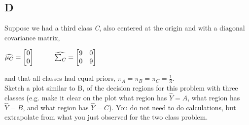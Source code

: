 \documentclass[12pt]{article}
\newcommand\tab[1][1cm]{\hspace*{#1}}
\begin{document}
\subsection{D}
Suppose we had a third class \emph{C}, also centered at the origin and with a diagonal covariance matrix,
\begin{center}
    $\widehat{\mu_C} = \begin{bmatrix}
            0 \\
            0
        \end{bmatrix}
        \tab
        \widehat{\sum_C} = \begin{bmatrix}
            9 & 0 \\
            0 & 9
        \end{bmatrix}
    $
\end{center}
and that all classes had equal priors, $\pi_A = \pi_B = \pi_C = \frac{1}{3}$.\\
Sketch a plot similar to B, of the decision regions for this problem with three classes (e.g. make it clear on the plot what region has $\hat{Y} = A$, what region has $\hat{Y} = B$, and what region has $\hat{Y} = C$). You do not need to do calculations, but extrapolate from what you just observed for the two class problem.

\end{document}
